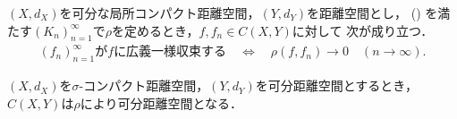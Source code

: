 	\begin{screen}
		\begin{thm}[広義一様収束を定める距離]
			$(X,d_X)$を可分な局所コンパクト距離空間，$(Y,d_Y)$を距離空間とし，
			()
			を満たす$(K_n)_{n=1}^\infty$で$\rho$を定めるとき，$f,f_n \in C(X,Y)$に対して
			次が成り立つ．
			\begin{align}
				\mbox{$(f_n)_{n=1}^\infty$が$f$に広義一様収束する}
				\quad \Longleftrightarrow \quad
				\rho(f,f_n) \longrightarrow 0
				\quad (n \longrightarrow \infty).
			\end{align}
		\end{thm}
	\end{screen}
	
	\begin{screen}
		\begin{thm}[$C(X,Y)$の可分性]\label{thm:separability_of_spaces_of_continuous_functions}
			$(X,d_X)$を$\sigma$-コンパクト距離空間，$(Y,d_Y)$を可分距離空間とするとき，$C(X,Y)$は$\rho$により可分距離空間となる．
		\end{thm}
	\end{screen}
	
